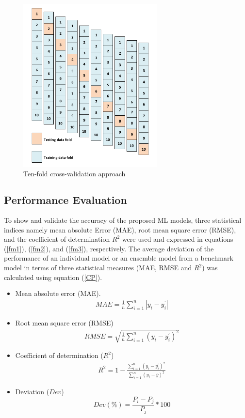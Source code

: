 \documentclass[11pt]{article}
\begin{document}
	
	\begin{figure}[!h]
		\begin{center}
			\includegraphics[width=0.65\textwidth,height=0.65\textwidth]{TC}
		\end{center}
		\caption{Ten-fold cross-validation approach}
		\label{fig:TFC}
	\end{figure}
	
	\subsection{Performance Evaluation}
	To show and validate the accuracy of the proposed ML models, three statistical indices namely mean absolute Error (MAE), root mean square error (RMSE), and the coefficient of determination $R^2$ were used and expressed in equations (\ref{fm1}), (\ref{fm2}), and (\ref{fm3}), respectively. The average deviation of the performance of an individual model or an ensemble model from a benchmark model in terms of  three statistical measures (MAE, RMSE and  $R^2$) was calculated using equation (\ref{CP}).
	
	\begin{itemize}
		\item Mean absolute error (MAE). 
		\begin{eqnarray}
		\label{fm1}
		MAE = \frac{1}{n}\sum_{i=1}^{n}{|y_i - y_i^{'}|}                                                       
		\end{eqnarray}
		\item Root mean square error (RMSE)
		\begin{eqnarray}
		\label{fm2}
		RMSE = \sqrt{\frac{1}{n}\sum_{i=1}^{n}({{ y_i  - y_i^{'}}} )^2}                                                         
		\end{eqnarray}
		\item Coefficient of determination ($R^2$)
		\begin{eqnarray}
		\label{fm3}
		R^2 = 1 - \frac{\sum_{i=1}^{n}(y_i - y_i^{'})^2}{ \sum_{i=1}^{n} (y_i -\overline{y})^2  }                                             
		\end{eqnarray}
		\item Deviation ($Dev$)
		\begin{equation}
		\label{CP}
		Dev(\%) = \frac{P_i - P_{j}}{ P_{j}} * 100
		\end{equation}
	\end{itemize} 
	
\end{document}
